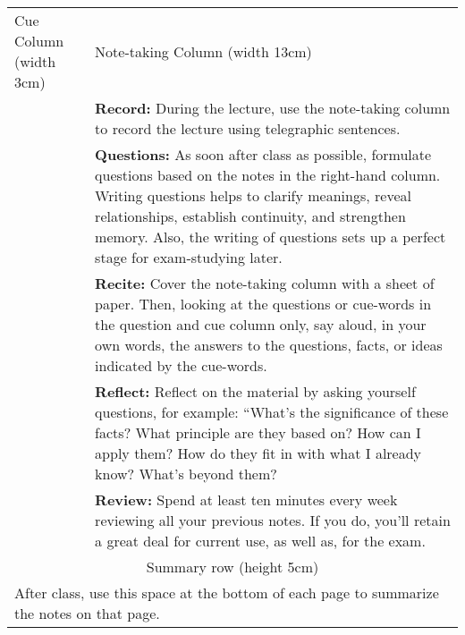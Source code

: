 
\title{}
\author{max-wn}
\date{April 24, 2022}



\maketitle

\begin{tabular}{|p{3cm}||p{13cm}|}
\hline
    Cue Column (width 3cm) & Note-taking Column (width 13cm) \\
    & \textbf{Record:} During the lecture, use the note-taking column to
    record the lecture using telegraphic sentences. \\
    & \textbf{Questions:} As soon after class as possible, formulate questions
    based on the notes in the right-hand column. Writing questions helps to
    clarify meanings, reveal relationships, establish continuity, and
    strengthen memory. Also, the writing of questions sets up a perfect stage
    for exam-studying later. \\
    & \textbf{Recite:} Cover the note-taking column with a sheet of paper.
    Then, looking at the questions or cue-words in the question and cue column
    only, say aloud, in your own words, the answers to the questions, facts,
    or ideas indicated by the cue-words. \\
    & \textbf{Reflect:} Reflect on the material by asking yourself questions,
    for example: “What’s the significance of these facts? What principle are
    they based on? How can I apply them? How do they fit in with what I
    already know?  What’s beyond them? \\
    & \textbf{Review:} Spend at least ten minutes every week reviewing all
    your previous notes. If you do, you’ll retain a great deal for current
    use, as well as, for the exam. \\
    \hline \hline
    \multicolumn{2}{|c|}{Summary row (height 5cm)} \\
    \multicolumn{2}{|p{16cm}|}{After class, use this space at the bottom of
    each page to summarize the notes on that page.} \\
\hline
\end{tabular}

\newpage


